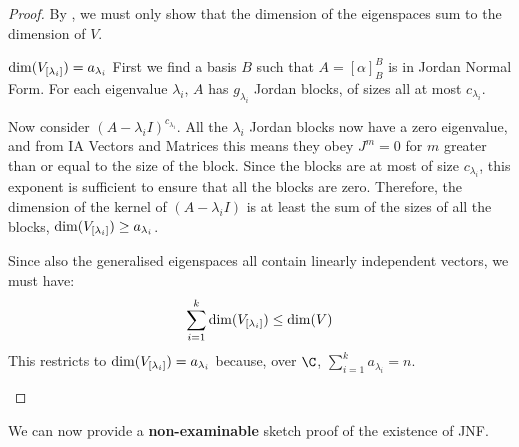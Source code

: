 \documentclass[../Main.tex]{subfiles}
\begin{document}
\begin{proof}
    By , we must only show that the dimension of the eigenspaces sum to the dimension of $V$.
    \begin{subproof}{$\dim({V}_{[\lambda_i]}) = a_{\lambda_i}$}
        First we find a basis $B$ such that $A = [\alpha]_B^B$ is in Jordan Normal Form. For each eigenvalue $\lambda_i$, $A$ has $g_{\lambda_i}$ Jordan blocks, of sizes all at most $c_{\lambda_i}$.
        
        Now consider $(A - \lambda_i I)^{c_{\lambda_i}}$. All the $\lambda_i$ Jordan blocks now have a zero eigenvalue, and from IA Vectors and Matrices this means they obey $J^m = 0$ for $m$ greater than or equal to the size of the block. Since the blocks are at most of size $c_{\lambda_i}$, this exponent is sufficient to ensure that all the blocks are zero. Therefore, the dimension of the kernel of $(A - \lambda_i I)$ is at least the sum of the sizes of all the blocks, $\dim({V}_{[\lambda_i]}) \geq a_{\lambda_i}$.

        Since also the generalised eigenspaces all contain linearly independent vectors, we must have:
        \begin{equation*}
            \sum_{i=1}^{k} \dim({V}_{[\lambda_i]}) \leq \dim(V)
        \end{equation*}
        This restricts to $\dim({V}_{[\lambda_i]}) = a_{\lambda_i}$ because, over $\C$, $\sum_{i = 1}^k a_{\lambda_i} = n$.
    \end{subproof}
\end{proof}
We can now provide a \textbf{non-examinable} sketch proof of the existence of JNF.
\end{document}
